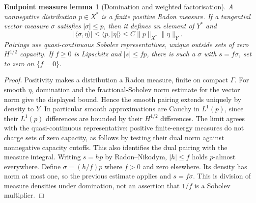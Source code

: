 \documentclass[11pt,a4paper]{article}
\newtheorem*{measurelemma}{Endpoint measure lemma}
\theoremstyle{definition}\newtheorem{definition}[theorem]{Definition}
\theoremstyle{remark}\newtheorem{remark}[theorem]{Remark}
\newcommand{\ip}[2]{\langle #1,#2\rangle}
\numberwithin{equation}{section}
\begin{document}
\begin{measurelemma}[Domination and weighted factorisation]\label{lem:endpointmeasure}
A nonnegative distribution $p\in X^*$ is a finite positive Radon measure. If a tangential vector measure $\sigma$ satisfies $|\sigma|\le p$, then it defines an element of $Y^*$ and
\[
 |\ip{\sigma}{\eta}|\le\ip{p}{|\eta|}
 \le C\|p\|_{X^*}\|\eta\|_Y.
\]
Pairings use quasi-continuous Sobolev representatives, unique outside sets of zero $H^{1/2}$ capacity. If $f\ge0$ is Lipschitz and $|s|\le fp$, there is such a $\sigma$ with $s=f\sigma$, set to zero on $\{f=0\}$.
\end{measurelemma}
\begin{proof}
Positivity makes a distribution a Radon measure, finite on compact $\Gamma$. For smooth $\eta$, domination and the fractional-Sobolev norm estimate for the vector norm give the displayed bound. Hence the smooth pairing extends uniquely by density to $Y$. In particular smooth approximations are Cauchy in $L^1(p)$, since their $L^1(p)$ differences are bounded by their $H^{1/2}$ differences. The limit agrees with the quasi-continuous representative: positive finite-energy measures do not charge sets of zero capacity, as follows by testing their dual norm against nonnegative capacity cutoffs. This also identifies the dual pairing with the measure integral. Writing $s=h p$ by Radon--Nikodym, $|h|\le f$ holds $p$-almost everywhere. Define $\sigma=(h/f)p$ where $f>0$ and zero elsewhere. Its density has norm at most one, so the previous estimate applies and $s=f\sigma$. This is division of measure densities under domination, not an assertion that $1/f$ is a Sobolev multiplier.
\end{proof}
\end{document}
